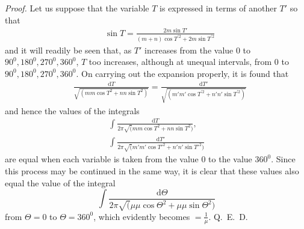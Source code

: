 \emph{Proof.} Let us suppose that the variable $T$ is expressed in terms of another $T'$ so that
\[
\begin{aligned}
&\sin T=\frac{2m\sin T'}{(m+n)\cos T^{\prime 2}+2m\sin T^{\prime 2}}
\end{aligned}
\]
and it will readily be seen that, as $T'$ increases from the value $0$ to $90^0,180^0,270^0,360^0$, $T$ too increases, although at unequal intervals, from $0$ to $90^0,180^0,270^0,360^0$. On carrying out the expansion properly, it is found that
\[
\begin{aligned}
&\frac{\mathrm dT}{\surd{(mm\cos T^2+nn\sin T^2)}}
=\frac{\mathrm dT'}{\surd{(m'm'\cos T^{\prime 2}+n'n'\sin T^{\prime 2})}}
\end{aligned}
\]
and hence the values of the integrals
\[
\begin{gathered}\int\frac{\mathrm{d}T}{2\pi\surd(mm\cos T^2+nn\sin T^2)},\\[7pt]
\int\frac{\mathrm{d}T'}{2\pi\surd(m'm'\cos T'^2+n'n'\sin T'^2)}\end{gathered}
\]
are equal when each variable is taken from the value $0$ to the value $360^{0}$. Since this process may be continued in the same way, it is clear that these values also equal the value of the integral
\[
\int\frac{\mathrm{d}\Theta}{2\pi\surd(\mu\mu\cos\Theta^2+\mu\mu\sin\Theta^2)}
\]
from $\Theta=0$ to $\Theta=360^{0}$, which evidently becomes $=\frac{1}{\mu}$. Q.~E.~D.

